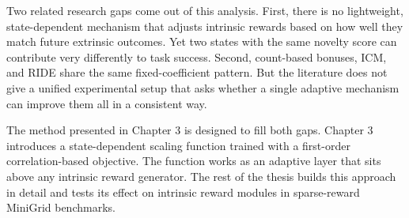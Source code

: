 Two related research gaps come out of this analysis. First, there is no lightweight, state-dependent mechanism that adjusts intrinsic rewards based on how well they match future extrinsic outcomes. Yet two states with the same novelty score can contribute very differently to task success. Second, count-based bonuses, ICM, and RIDE share the same fixed-coefficient pattern. But the literature does not give a unified experimental setup that asks whether a single adaptive mechanism can improve them all in a consistent way.

The method presented in Chapter 3 is designed to fill both gaps. Chapter 3 introduces a state-dependent scaling function trained with a first-order correlation-based objective. The function works as an adaptive layer that sits above any intrinsic reward generator. The rest of the thesis builds this approach in detail and tests its effect on intrinsic reward modules in sparse-reward MiniGrid benchmarks.
